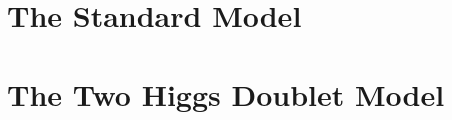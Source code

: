 \chapter{The Standard Model}
\label{c:secSM}
 
    


\chapter{The Two Higgs Doublet Model}
\label{c:sec2HDM}




